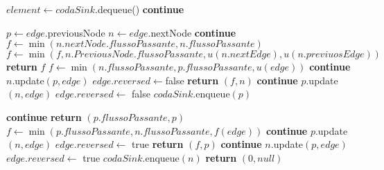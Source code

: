 \documentclass{article}
\begin{document}
\newpage
\begin{algorithm}
\begin{algorithmic}
\STATE $element \leftarrow codaSink.$dequeue()
\STATE \textbf{continue}
\ENDIF

\STATE $p \leftarrow edge.$previousNode 
\STATE $n \leftarrow edge$.nextNode
\STATE \textbf{continue}
\ELSE
{}
\STATE $f \leftarrow \min (n.nextNode.flussoPassante, n.flussoPassante) $
\STATE $f \leftarrow \min(f,n.PreviousNode.flussoPassante, u(n.nextEdge), u(n.previuosEdge))$
\STATE \textbf{return} $f$
\ENDIF
\ENDIF
\STATE $f \leftarrow \min (n.flussoPassante,p.flussoPassante,u(edge))$ 
\STATE \textbf{continue}
\ENDIF
\STATE $n$.update$(p,edge)$
\STATE $edge.reversed \leftarrow $false
\STATE \textbf{return} $(f,n)$
\ENDIF
\ENDIF
{}
\STATE \textbf{continue}
\ENDIF
\STATE $p.$update$(n,edge)$
\STATE $edge.reversed \leftarrow$ false
\STATE $codaSink.$enqueue$(p)$
\end{algorithmic}
\end{algorithm}
\newpage
\begin{algorithm}
\begin{algorithmic}
\STATE \textbf{continue}
\ELSE
{}
\STATE \textbf{return} $(p.flussoPassante,p)$
\ENDIF
\STATE $f \leftarrow \min(p.flussoPassante,n.flussoPassante,f(edge))$ 
\STATE \textbf{continue}
\ENDIF
\STATE $p.$update$(n,edge)$
\STATE $edge.reversed \leftarrow$ true
\STATE \textbf{return } $(f,p)$
\ENDIF
\ENDIF
{}
\STATE \textbf{continue}
\ENDIF
\STATE $n.$update$(p,edge)$
\STATE $edge.reversed \leftarrow$ true
\STATE $codaSink.$enqueue$(n)$
\ENDIF
\ENDFOR
\ENDIF
\ENDWHILE
\STATE \textbf{return} $(0,null)$
\end{algorithmic}
\end{algorithm}
\end{document}
